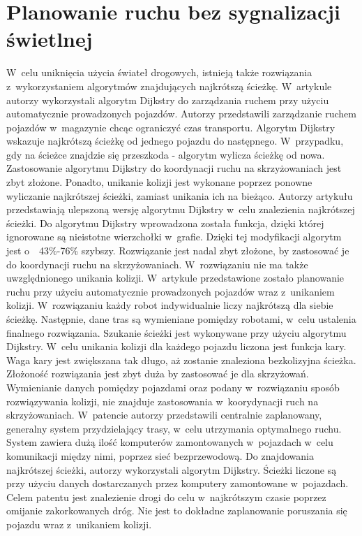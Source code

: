 \section{Planowanie ruchu bez sygnalizacji świetlnej}

W~celu uniknięcia użycia świateł drogowych, istnieją także rozwiązania z~wykorzystaniem algorytmów znajdujących najkrótszą ścieżkę. W~artykule \cite{shaikh2013agv} autorzy wykorzystali algorytm Dijkstry do zarządzania ruchem przy użyciu automatycznie prowadzonych pojazdów. Autorzy przedstawili zarządzanie ruchem pojazdów w~magazynie chcąc ograniczyć czas transportu. Algorytm Dijkstry wskazuje najkrótszą ścieżkę od jednego pojazdu do następnego. W~przypadku, gdy na ścieżce znajdzie się przeszkoda - algorytm wylicza ścieżkę od nowa. Zastosowanie algorytmu Dijkstry do koordynacji ruchu na skrzyżowaniach jest zbyt złożone. Ponadto, unikanie kolizji jest wykonane poprzez ponowne wyliczanie najkrótszej ścieżki, zamiast unikania ich na bieżąco.
\newline
\indent
Autorzy artykułu \cite{huang2013improved} przedstawiają ulepszoną wersję algorytmu Dijkstry w~celu znalezienia najkrótszej ścieżki. Do algorytmu Dijkstry wprowadzona została funkcja, dzięki której ignorowane są nieistotne wierzchołki w~grafie. Dzięki tej modyfikacji algorytm jest o~~43\%-76\% szybszy. Rozwiązanie jest nadal zbyt złożone, by zastosować je do koordynacji ruchu na skrzyżowaniach. W~rozwiązaniu nie ma także uwzględnionego unikania kolizji.
\newline
\indent
W~artykule \cite{ando2003autonomous} przedstawione zostało planowanie ruchu przy użyciu automatycznie prowadzonych pojazdów wraz z~unikaniem kolizji. W~rozwiązaniu każdy robot indywidualnie liczy najkrótszą dla siebie ścieżkę. Następnie, dane tras są wymieniane pomiędzy robotami, w~celu ustalenia finalnego rozwiązania. Szukanie ścieżki jest wykonywane przy użyciu algorytmu Dijkstry. W~celu unikania kolizji dla każdego pojazdu liczona jest funkcja kary. Waga kary jest zwiększana tak długo, aż zostanie znaleziona bezkolizyjna ścieżka. Złożoność rozwiązania jest zbyt duża by zastosować je dla skrzyżowań. Wymienianie danych pomiędzy pojazdami oraz podany w~rozwiązaniu sposób rozwiązywania kolizji, nie znajduje zastosowania w~koorydynacji ruch na skrzyżowaniach.
\newline
\indent
W~patencie \cite{gazis1997optimal} autorzy przedstawili centralnie zaplanowany, generalny system przydzielający trasy, w~celu utrzymania optymalnego ruchu. System zawiera dużą ilość komputerów zamontowanych w~pojazdach w~celu komunikacji między nimi, poprzez sieć bezprzewodową. Do znajdowania najkrótszej ścieżki, autorzy wykorzystali algorytm Dijkstry. Ścieżki liczone są przy użyciu danych dostarczanych przez komputery zamontowane w~pojazdach. Celem patentu jest znalezienie drogi do celu w~najkrótszym czasie poprzez omijanie zakorkowanych dróg. Nie jest to dokładne zaplanowanie poruszania się pojazdu wraz z~unikaniem kolizji.
